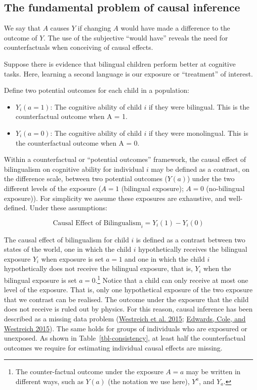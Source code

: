 \documentclass[
  singlecolumn]{report}
\providecommand{\tightlist}{%
  \setlength{\itemsep}{0pt}\setlength{\parskip}{0pt}}\usepackage{longtable,booktabs,array}
\begin{document}
\hypertarget{the-fundamental-problem-of-causal-inference}{%
\subsection{The fundamental problem of causal
inference}\label{the-fundamental-problem-of-causal-inference}}

We say that \(A\) causes \(Y\) if changing \(A\) would have made a
difference to the outcome of \(Y\). The use of the subjective ``would
have'' reveals the need for counterfactuals when conceiving of causal
effects.

Suppose there is evidence that bilingual children perform better at
cognitive tasks. Here, learning a second language is our exposure or
``treatment'' of interest.

Define two potential outcomes for each child in a population:

\begin{itemize}
\tightlist
\item
  \(Y_i(a = 1)\): The cognitive ability of child \(i\) if they were
  bilingual. This is the counterfactual outcome when A = 1.
\item
  \(Y_i(a = 0)\): The cognitive ability of child \(i\) if they were
  monolingual. This is the counterfactual outcome when A = 0.
\end{itemize}

Within a counterfactual or ``potential outcomes'' framework, the causal
effect of bilingualism on cognitive ability for individual \(i\) may be
defined as a contrast, on the difference scale, between two potential
outcomes (\(Y(a)\)) under the two different levels of the exposure
(\(A = 1\) (bilingual exposure); \(A = 0\) (no-bilingual exposure)). For
simplicity we assume these exposures are exhaustive, and well-defined.
Under these assumptions:

\[
\text{Causal Effect of Bilingualism}_i = Y_i(1) - Y_i(0) 
\]

The causal effect of bilingualism for child \(i\) is defined as a
contrast between two states of the world, one in which the child \(i\)
hypothetically receives the bilingual exposure \(Y_i\) when exposure is
set \(a=1\) and one in which the child \(i\) hypothetically does not
receive the bilingual exposure, that is, \(Y_i\) when the bilingual
exposure is set \(a=0\).\footnote{The counter-factual outcome under the
  exposure \(A = a\) may be written in different ways, such as \(Y(a)\)
  (the notation we use here), \(Y^a\), and \(Y_a\).} Notice that a child
can only receive at most one level of the exposure. That is, only one
hypothetical exposure of the two exposure that we contrast can be
realised. The outcome under the exposure that the child does not receive
is ruled out by physics. For this reason, causal inference has been
described as a missing data problem
(\protect\hyperlink{ref-westreich2015}{Westreich et al. 2015};
\protect\hyperlink{ref-edwards2015}{Edwards, Cole, and Westreich 2015}).
The same holds for groups of individuals who are exposured or unexposed.
As shown in Table~\ref{tbl-consistency}, at least half the
counterfactual outcomes we require for estimating individual causal
effects are missing.
\end{document}
